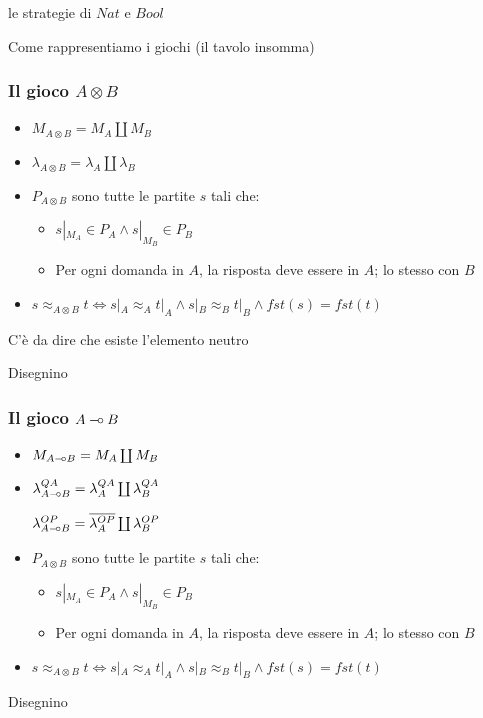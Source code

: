 \documentclass{beamer}
\newcommand{\limp}{\mathbin{{-}\mkern-3.5mu{\circ}}}
\begin{document}
\begin{frame}
	
	\begin{example}
		le strategie di $Nat$ e $Bool$
	\end{example}
	
\end{frame}

\begin{frame}
	
	Come rappresentiamo i giochi (il tavolo insomma)
	
\end{frame}

\begin{frame}
	
	\frametitle{Il gioco $A \otimes B$}
	
	\begin{itemize}
		\item $M_{A\otimes B}=M_A \coprod M_B$
		\item $\lambda_{A\otimes B}=\lambda_A \coprod \lambda_B$
		\item $P_{A\otimes B}$ sono tutte le partite $s$ tali che:
		\begin{itemize}
			\item $s|_{M_A} \in P_A \wedge s|_{M_B} \in P_B$
			\item Per ogni domanda in $A$, la risposta deve essere in $A$; lo stesso con $B$
		\end{itemize}
		\item $s\approx_{A\otimes B} t \Leftrightarrow s|_A \approx_A t|_A \wedge s|_B \approx_B t|_B \wedge fst(s)=fst(t)$ 
	\end{itemize}
	
	C'è da dire che esiste l'elemento neutro
	
	Disegnino
	
\end{frame}


\begin{frame}
	
	\frametitle{Il gioco $A \limp B$}
	
	\begin{itemize}
		\item $M_{A\limp B}=M_A \coprod M_B$
		\item $\lambda^{QA}_{A\limp B}=\lambda^{QA}_A \coprod \lambda^{QA}_B$
		
		$\lambda^{OP}_{A\limp B}=\overline{\lambda^{OP}_A} \coprod \lambda^{OP}_B$
		\item $P_{A\otimes B}$ sono tutte le partite $s$ tali che:
		\begin{itemize}
			\item $s|_{M_A} \in P_A \wedge s|_{M_B} \in P_B$
			\item Per ogni domanda in $A$, la risposta deve essere in $A$; lo stesso con $B$
		\end{itemize}
		\item $s\approx_{A\otimes B} t \Leftrightarrow s|_A \approx_A t|_A \wedge s|_B \approx_B t|_B \wedge fst(s)=fst(t)$ 
	\end{itemize}
	
	Disegnino
	
\end{frame}
\end{document}
